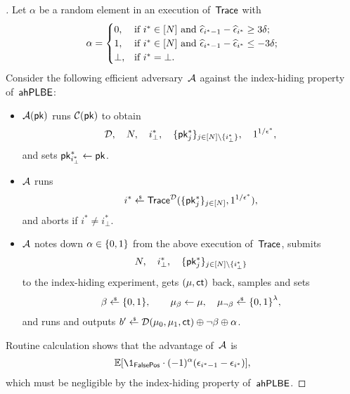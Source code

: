 \begin{proof}[]
Let $\alpha$ be a random element in an execution of~$\Trace$ with
\begin{align*}
\alpha=\begin{cases}
0,&\textup{if }i^\ast\in[N]\textup{ and }
\widehat{\epsilon}_{i^\ast-1}-\widehat{\epsilon}_{i^\ast}\geq 3\delta;\\
1,&\textup{if }i^\ast\in[N]\textup{ and }
\widehat{\epsilon}_{i^\ast-1}-\widehat{\epsilon}_{i^\ast}\leq -3\delta;\\
\bot,&\textup{if }i^\ast=\bot.
\end{cases}
\end{align*}
Consider the following efficient adversary~${\mathcal{A}}$ against the index-hiding property of~$\AHPLBE$:
\begin{itemize}
\item $\scriptA(\pk)$ runs $\scriptC(\pk)$ to obtain
\begin{align*}
\scriptD,\quad
N,\quad
i_\bot^\ast,\quad
\{\pk^\ast_j\}_{j\in{[N]\setminus{\{i_\bot^\ast\}}}},\quad
1^{1/\epsilon^\ast},
\end{align*}
and sets ${\pk^\ast_{i_\bot^\ast}\gets\pk}$.
\item ${\mathcal{A}}$ runs
\begin{align*}
i^\ast\draws\Trace^\scriptD(\{\pk^\ast_j\}_{j\in[N]},1^{1/\epsilon^\ast}),
\end{align*}
and aborts if ${i^\ast\neq i_\bot^\ast}$.
\item ${\mathcal{A}}$ notes down ${\alpha\in{\{0,1\}}}$ from the above execution of~$\Trace$,
submits
\begin{align*}
N,\quad
i_\bot^\ast,\quad
\{\pk^\ast_j\}_{j\in[N]\setminus\{i_\bot^\ast\}}
\end{align*}
to the index-hiding experiment,
gets $(\mu,\ct)$ back,
samples and sets
\begin{align*}
\beta\draws\bit,\qquad
\mu_\beta\gets\mu,\quad
\mu_{\neg\beta}\draws\bit^\lambda,
\end{align*}
and runs and outputs
${b'\draws\scriptD(\mu_0,\mu_1,\ct)\oplus\neg\beta\oplus\alpha}$.
\end{itemize}
Routine calculation shows that the advantage of~${\mathcal{A}}$ is
\begin{align*}
\E[\1_\FalsePos\cdot(-1)^\alpha(\epsilon_{i^\ast-1}-\epsilon_{i^\ast})],
\end{align*}
which must be negligible by the index-hiding property of~$\AHPLBE$.


\end{proof}
